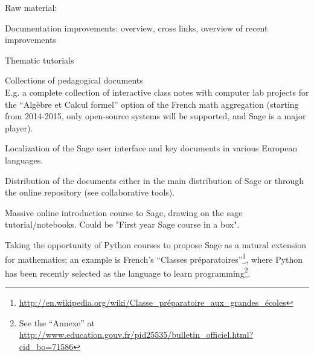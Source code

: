 \begin{workpackage}[id=dissem,wphases=18-48!.5,
  title=Dissemination and Community Building,
  lead=PS,
  PSRM=10, %
  SARM=18,
  USORM=10,
  USHRM=8,
  USRM=24,
  UVRM=2,
  UBRM=4,
]
Raw material:
\begin{compactitem}
\item Documentation improvements: overview, cross links, overview of
  recent improvements
\item Thematic tutorials
\item Collections of pedagogical documents\\
  E.g. a complete collection of interactive class notes with computer
  lab projects for the ``Algèbre et Calcul formel'' option of the
  French math aggregation (starting from 2014-2015, only open-source
  systems will be supported, and Sage is a major player).
\item Localization of the Sage user interface and key documents in
  various European languages.
\item Distribution of the documents either in the main distribution of
  Sage or through the online repository (see collaborative tools).
\item Massive online introduction course to Sage, drawing on the sage tutorial/notebooks.
Could be "First year Sage course in a box".
\item Taking the opportunity of Python courses to propose Sage as a natural extension
for mathematics; an example is French's 
``Classes pr\'eparatoires''\footnote{
\url{http://en.wikipedia.org/wiki/Classe_préparatoire_aux_grandes_écoles}}, 
where Python has been recently selected as the language to learn programming\footnote{See 
the ``Annexe'' at 
\url{http://www.education.gouv.fr/pid25535/bulletin_officiel.html?cid_bo=71586}}.
\end{compactitem}



\end{workpackage}
